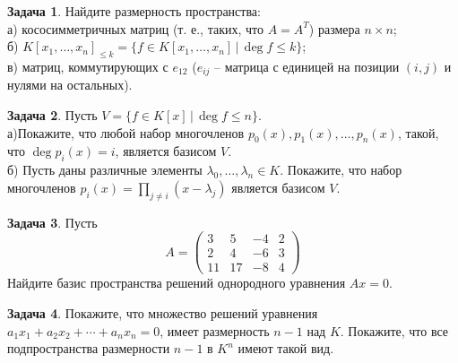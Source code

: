 \documentclass[12pt, fleqn]{extarticle}
\theoremstyle{definition}
\newtheorem{problem}{Задача}
\theoremstyle{remark}
\begin{document}
\begin{problem}
Найдите размерность пространства:\\
а) кососимметричных матриц (т. е., таких, что $A = A^{T}$) размера $n\times n$;\\
б) $K[x_1,\dots,x_n]_{\leq k}=\{ f \in K[x_1,\dots,x_n]\,|\, \deg f\leq k\}$;\\
в) матриц, коммутирующих с $e_{12}$ 
($e_{ij}$ -- матрица с единицей на позиции $(i, j)$ и нулями на остальных).
\end{problem}

\begin{problem}
Пусть $V=\{f\in K[x]\,|\, \deg f\leq n\}$. \\
а)Покажите, что любой набор многочленов $p_0(x), p_1(x), \dots, p_n(x)$, 
такой, что $\deg p_i(x)=i$, является базисом $V$.\\
б) Пусть даны различные элементы $\lambda_0, \dots, \lambda_n\in K$. 
Покажите, что набор многочленов $p_i(x)=\prod_{j\neq i}(x-\lambda_j)$ является базисом $V$.
\end{problem}


\begin{problem}
Пусть 
$$A=\left(\begin{matrix}
3& 5&-4& 2 \\
2& 4&-6& 3 \\
11& 17& -8& 4 
\end{matrix}\right)$$
Найдите базис пространства решений однородного уравнения $Ax=0$.
\end{problem}

\begin{problem}
Покажите, что множество решений уравнения $a_1x_1+a_2x_2+\cdots+a_nx_n=0$, имеет размерность $n-1$ над $K$. Покажите, что все подпространства размерности $n-1$ в $K^n$ имеют такой вид.
\end{problem}
\end{document}
